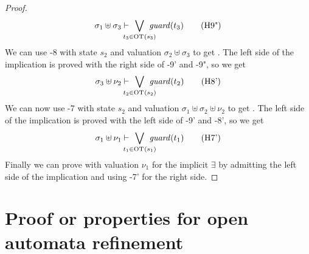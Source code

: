 \documentclass{article}
\begin{document}
\begin{proof}
\begin{gather*}
		\sigma_1 \uplus \sigma_3 \vdash \bigvee_\subbox{t_3 \in \fOT{s_3}} \fguard{t_3} \hyp{9"}
	\end{gather*}
	We can use \hyp{8} with state \(s_2\) and valuation \(\sigma_2 \uplus \sigma_3\) to get .
	The left side of the implication is proved with the right side of \hyp{9'} and \hyp{9"}, so we get
	\[ \sigma_3 \uplus \nu_2 \vdash \bigvee_\subbox{t_2 \in \fOT{s_2}} \fguard{t_2} \hyp{8'} \]
	We can now use \hyp{7} with state \(s_2\) and valuation \(\sigma_1 \uplus \sigma_2 \uplus \nu_2\) to get .
	The left side of the implication is proved with the left side of \hyp{9'} and \hyp{8'}, so we get
	\[ \sigma_1 \uplus \nu_1 \vdash \bigvee_\subbox{t_1 \in \fOT{s_1}} \fguard{t_1} \hyp{7'} \]
	Finally we can prove  with valuation \(\nu_1\) for the implicit \(\exists\) by admitting the left side of the implication and using \hyp{7'} for the right side.
\end{proof}


\section{Proof or properties for open automata refinement}
\end{document}
